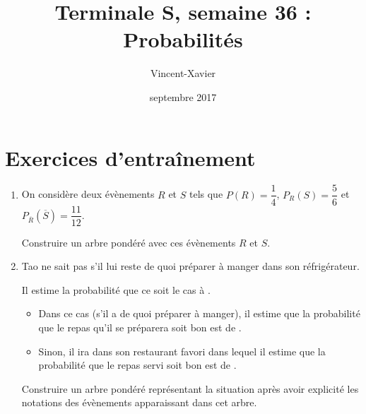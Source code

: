 \documentclass[12pt,a4paper,french]{article}
\author{Vincent-Xavier \bsc{Jumel}}
\title{Terminale S, semaine 36 : Probabilités}
\date{septembre 2017}
\begin{document}
\maketitle

\newpage

\section{Exercices d'entraînement}

\begin{question}
  \begin{enumerate}
    \item On considère deux évènements $R$ et $S$ tels que
      $P(R)=\dfrac{1}{4}$, $P_R(S)=\dfrac{5}{6}$ et
      $P_{\overline{R}}\left(\overline{S}\right)=\dfrac{11}{12}$.

      Construire un arbre pondéré avec ces évènements $R$ et $S$.
    \item Tao ne sait pas s'il lui reste de quoi préparer à manger dans son
      réfrigérateur.

      Il estime la probabilité que ce soit le cas à .
      \begin{itemize}
        \item Dans ce cas (s'il a de quoi préparer à manger), il estime que
          la probabilité que le repas qu'il se préparera soit bon est de
          .
        \item Sinon, il ira dans son restaurant favori dans lequel il estime
          que la probabilité que le repas servi soit bon est de
          .
      \end{itemize}

      Construire un arbre pondéré représentant la situation après avoir
      explicité les notations des évènements apparaissant dans cet arbre.
  \end{enumerate}
\end{question}
\end{document}
